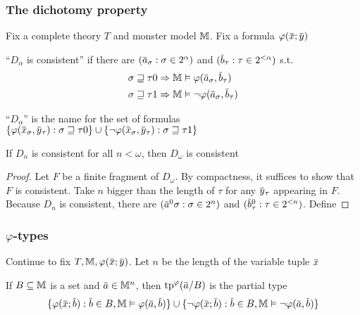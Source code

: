 \documentclass[11pt]{article}
\begin{document}
\subsubsection{The dichotomy property}
\label{sec:orgabfd473}
Fix a complete theory \(T\) and monster model \(\mathbb{M}\). Fix a formula \(\varphi(\barx;\bary)\)
\begin{definition}[]
``\(D_\alpha\) is consistent'' if there are \((\bara_\sigma:\sigma\in 2^\alpha)\) and \((\barb_\tau:\tau\in 2^{<\alpha})\) s.t.
\begin{align*}
&\sigma\sqsupseteq\tau 0\Rightarrow\M\vDash\varphi(\bara_\sigma,\barb_\tau)\\
&\sigma\sqsupseteq\tau 1\Rightarrow\M\vDash\neg\varphi(\bara_\sigma,\barb_\tau)
\end{align*}
\end{definition}

\begin{remark}
``\(D_\alpha\)'' is the name for the set of
formulas \(\{\varphi(\barx_\sigma,\bary_\tau):\sigma\sqsupseteq\tau 0\}\cup\{\neg\varphi(\barx_\sigma,\bary_\tau):\sigma\sqsupseteq\tau 1\}\)
\end{remark}

\begin{lemma}[]
\label{dadt4}
If \(D_n\) is consistent for all \(n<\omega\), then \(D_\omega\) is consistent
\end{lemma}

\begin{proof}
Let \(F\) be a finite fragment of \(D_\omega\). By compactness, it suffices to show that \(F\) is
consistent. Take \(n\) bigger than the length of \(\tau\) for any \(\bary_\tau\) appearing in \(F\).
Because \(D_n\) is consistent, there are \((\bara^0\sigma:\sigma\in 2^n)\) and \((\barb^0_\tau:\tau\in 2^{<n})\).
Define
\end{proof}
\subsubsection{\texorpdfstring{\(\varphi\)}{φ}-types}
\label{sec:orgae7648c}
Continue to fix \(T,\M,\varphi(\barx;\bary)\). Let \(n\) be the length of the variable tuple \(\barx\)
\begin{definition}[]
If \(B\subseteq\mathbb{M}\) is a set and \(\bara\in\M^n\), then \(\tp^\varphi(\bara/B)\) is the partial type
\begin{equation*}
\{\varphi(\barx;\barb):\barb\in B,\M\vDash\varphi(\bara,\barb)\}\cup\{\neg\varphi(\barx;\barb):\barb\in B,\M\vDash\neg\varphi(\bara,\barb)\}
\end{equation*}
\end{definition}
\end{document}
